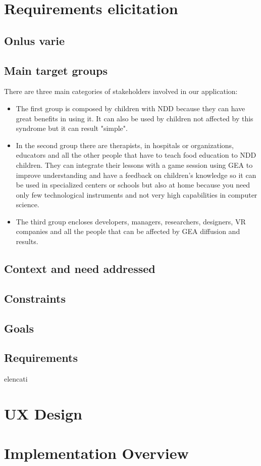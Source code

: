 \section{Requirements elicitation}
\subsection{Onlus varie}
\subsection{Main target groups}
There are three main categories of stakeholders involved in our application:
\begin{itemize}
\item The first group is composed by children with NDD because they can have great benefits in using it. It can also be used by children not affected by this syndrome but it can result "simple".
\item In the second group there are therapists, in hospitals or organizations, educators and all the other people that have to teach food education to NDD children. They can integrate their lessons with a game session using GEA to improve understanding and have a feedback on children's knowledge so it can be used in specialized centers or schools but also at home because you need only few technological instruments and not very high capabilities in computer science.
\item The third group encloses developers, managers, researchers, designers, VR companies and all the people that can be affected by GEA diffusion and results.
\end{itemize} 
\subsection{Context and need addressed}
\subsection{Constraints}
\subsection{Goals}
\subsection{Requirements}
elencati

\section{UX Design}
\section{Implementation Overview}